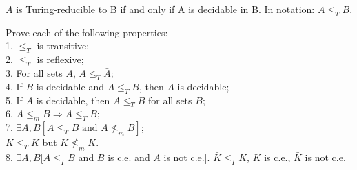  $A$ is Turing-reducible to B if and only if A is decidable in
B. In notation: $A \le_T B$.

 Prove each of the following properties:\\
1. $\le_T$ is transitive;\\
2. $\le_T$ is reflexive;\\
3. For all sets $A$, $A \le_T \bar{A}$;\\
4. If $B$ is decidable and $A \le_T B$, then $A$ is decidable; \\
5. If $A$ is decidable, then $A \le_T B$ for all sets $B$;\\
6. $A \le_m B \Rightarrow A \le_T B$;\\
7. $\exists A, B[A \le_T B \text{ and } A \nleq_m B]$;\\
$\bar{K} \le_T K$ but $\bar{K} \nleq_m K$.\\
8. $\exists A, B[A \le_T B$ and $B$ is c.e. and $A$ is not c.e.].
$\bar{K} \le_T K$, $K$ is c.e., $\bar{K}$ is not c.e.


